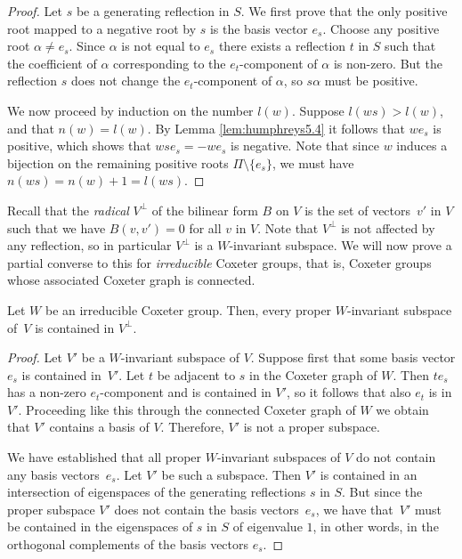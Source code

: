 \documentclass[main.tex]{subfiles}
\begin{document}
\begin{proof}
Let $s$ be a generating reflection in $S$. We first prove that the only positive root mapped to a negative root by $s$ is the basis vector $e_s$. Choose any positive root $\alpha \neq e_s$. Since $\alpha$ is not equal to $e_s$ there exists a reflection $t$ in $S$ such that the coefficient of $\alpha$ corresponding to the $e_t$-component of $\alpha$ is non-zero. But the reflection $s$ does not change the $e_t$-component of $\alpha$, so $s\alpha$ must be positive.

We now proceed by induction on the number $l(w)$. Suppose $l(ws) > l(w)$, and that $n(w) = l(w)$. By Lemma \ref{lem:humphreys5.4} it follows that $we_s$ is positive, which shows that $wse_s = -we_s$ is negative. Note that since $w$ induces a bijection on the remaining positive roots $\Pi \setminus \{e_s\}$, we must have $n(ws) = n(w) + 1 = l(ws)$.
\end{proof}

Recall that the \textit{radical} $V^\perp$ of the bilinear form $B$ on $V$ is the set of vectors~$v'$ in $V$ such that we have $B(v, v') = 0$ for all $v$ in $V$. Note that $V^\perp$ is not affected by any reflection, so in particular $V^\perp$ is a $W$-invariant subspace. We will now prove a partial converse to this for \textit{irreducible} Coxeter groups, that is, Coxeter groups whose associated Coxeter graph is connected.

\begin{theorem}\label{thm:invariant-subspaces}
	Let $W$ be an irreducible Coxeter group. Then, every 
	proper $W$-invariant subspace of~$V$ is contained 
	in $V^\perp$.
\end{theorem}

\begin{proof}
Let $V'$ be a $W$-invariant subspace of $V$. Suppose first that some basis vector $e_s$ is contained in~$V'$. Let $t$ be adjacent to $s$ in the Coxeter graph of $W$. Then $te_s$ has a non-zero $e_t$-component and is contained in $V'$, so it follows that also $e_t$ is in $V'$. Proceeding like this through the connected Coxeter graph of $W$ we obtain that $V'$ contains a basis of $V$. Therefore, $V'$ is not a proper subspace.

We have established that all proper $W$-invariant subspaces of $V$ do not contain any basis vectors~$e_s$. Let $V'$ be such a subspace. Then $V'$ is contained in an intersection of eigenspaces of the generating reflections $s$ in $S$. But since the proper subspace $V'$ does not contain the basis vectors~$e_s$, we have that~$V'$ must be contained in the eigenspaces of $s$ in $S$ of eigenvalue $1$, in other words, in the orthogonal complements of the basis vectors $e_s$.
\end{proof}
\end{document}
